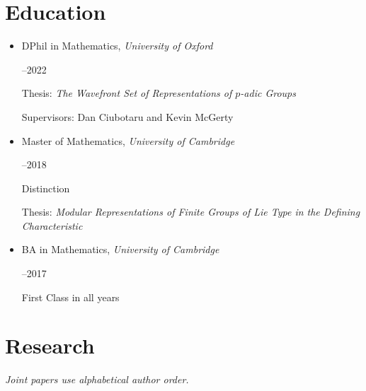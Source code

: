 \documentclass[11pt]{article}
\begin{document}
\section*{Education}
\begin{itemize}[itemsep=8pt]
\item\begin{minipage}[t]{\dimexpr\linewidth-1.2in\relax}
\raggedright DPhil in Mathematics, \textit{University of Oxford}
\end{minipage}\hfill\begin{minipage}[t]{1.05in}--2022\end{minipage}\par\nopagebreak
{\small
Thesis: \textit{The Wavefront Set of Representations of $p$-adic Groups}\par\nopagebreak
Supervisors: Dan Ciubotaru and Kevin McGerty\par}

\item\begin{minipage}[t]{\dimexpr\linewidth-1.2in\relax}
\raggedright Master of Mathematics, \textit{University of Cambridge}
\end{minipage}\hfill\begin{minipage}[t]{1.05in}--2018\end{minipage}\par\nopagebreak
{\small
Distinction\par\nopagebreak
Thesis: \textit{Modular Representations of Finite Groups of Lie Type in the Defining Characteristic}\par}

\item\begin{minipage}[t]{\dimexpr\linewidth-1.2in\relax}
\raggedright BA in Mathematics, \textit{University of Cambridge}
\end{minipage}\hfill\begin{minipage}[t]{1.05in}--2017\end{minipage}\par\nopagebreak
{\small First Class in all years\par}
\end{itemize}

\section*{Research}
\textit{Joint papers use alphabetical author order.}
\end{document}
